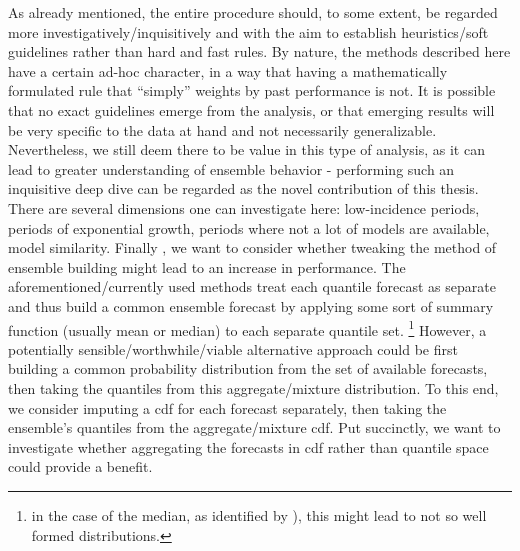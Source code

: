 As already mentioned, the entire procedure should, to some extent, be regarded more investigatively/inquisitively and with the aim to establish heuristics/soft guidelines rather than hard and fast rules. By nature, the methods described here have a certain ad-hoc character, in a way that having a mathematically formulated rule that ``simply'' weights by past performance is not. It is possible that no exact guidelines emerge from the analysis, or that emerging results will be very specific to the data at hand and not necessarily generalizable. Nevertheless, we still deem there to be value in this type of analysis, as it can lead to greater understanding of ensemble behavior - performing such an inquisitive deep dive can be regarded as the novel contribution of this thesis.\\
There are several dimensions one can investigate here: low-incidence periods, periods of exponential growth, periods where not a lot of models are available, model similarity.
Finally , we want to consider whether tweaking the method of ensemble building might lead to an increase in performance. The aforementioned/currently used methods treat each quantile forecast as separate and thus build a common ensemble forecast by applying some sort of summary function (usually mean or median) to each separate quantile set. \footnote{in the case of the median, as identified by \cite{bracher_pre-registered_2021}), this might lead to not so well formed distributions.} However, a potentially sensible/worthwhile/viable alternative approach could be first building a common probability distribution from the set of available forecasts, then taking the quantiles from this aggregate/mixture distribution. To this end, we consider imputing a \ac{cdf} for each forecast separately, then taking the ensemble's quantiles from the aggregate/mixture \ac{cdf}. Put succinctly, we want to investigate whether aggregating the forecasts in \ac{cdf} rather than quantile space could provide a benefit. \\
